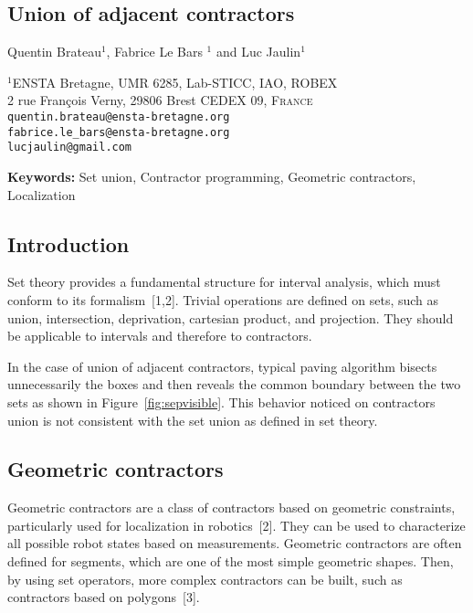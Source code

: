 \documentclass[14pt, a4paper]{article}
\newcommand\authors{Quentin Brateau$^{1}$, Fabrice Le Bars $^{1}$ and Luc Jaulin$^{1}$}
\newcommand\papertitle{Union of adjacent contractors}
\begin{document}
	\begin{center}

	\section*{\papertitle}
	\vspace*{0.8cm}
	{\large \authors}

	\bigskip

	{
		\small $^{1}$ENSTA Bretagne, UMR 6285, Lab-STICC, IAO, ROBEX\\
		2 rue François Verny, 29806 Brest CEDEX 09, \textsc{France} \\
		\medskip
		\texttt{quentin.brateau@ensta-bretagne.org}\\
		\texttt{fabrice.le\_bars@ensta-bretagne.org}\\
		\texttt{lucjaulin@gmail.com}\\
	}

	\end{center}

	\bigskip

	{\noindent\bf Keywords:} Set union, Contractor programming, Geometric contractors, Localization

	\subsection*{Introduction}
		Set theory provides a fundamental structure for interval analysis, which must conform to its formalism~[1,2]. Trivial operations are defined on sets, such as union, intersection, deprivation, cartesian product, and projection. They should be applicable to intervals and therefore to contractors.

		In the case of union of adjacent contractors, typical paving algorithm bisects unnecessarily the boxes and then reveals the common boundary between the two sets as shown in Figure~\ref{fig:sepvisible}. This behavior noticed on contractors union is not consistent with the set union as defined in set theory.

	\subsection*{Geometric contractors}
		Geometric contractors are a class of contractors based on geometric constraints, particularly used for localization in robotics~[2]. They can be used to characterize all possible robot states based on measurements. Geometric contractors are often defined for segments, which are one of the most simple geometric shapes. Then, by using set operators, more complex contractors can be built, such as contractors based on polygons~[3].
\end{document}
